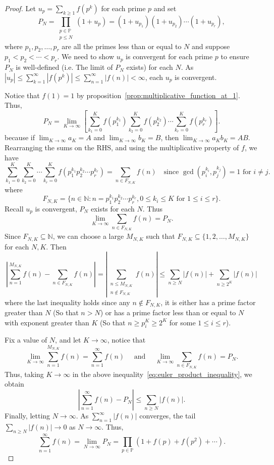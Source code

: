 \documentclass{elegantbook}
\begin{document}
\begin{proof}
  Let $u_p = \sum_{k\geq 1} f(p^k)$ for each prime $p$ and set
  \[
    P_N = \prod_{\substack{p\in\mathbb{P}\\p\leq N}} \left(1 + u_p\right)= (1 + u_{p_1})(1 + u_{p_2}) \cdots (1 + u_{p_r}),
  \]
  where $p_1, p_2, \ldots, p_r$ are all the primes less than or equal to $N$ and suppose $p_1<p_2<\cdots<p_r$. We need to show $u_p$ is convergent for each prime $p$ to ensure $P_N$ is well-defined (i.e. The limit of $P_N$ exists) for each $N$. As $|u_p|\leq \sum_{k=1}^{\infty} |f(p^k)|\leq \sum_{n=1}^{\infty} |f(n)|<\infty$, each $u_p$ is convergent.
  
  Notice that $f(1)=1$ by proposition~\ref{prop:multiplicative_function_at_1}. Thus,
  \[
    P_N = \lim_{K\to\infty}[\sum_{k_1=0}^{K} f(p_1^{k_1})\sum_{k_2=0}^{K} f(p_2^{k_2}) \cdots \sum_{k_r=0}^{K} f(p_r^{k_r})].
  \]
  because if $\lim_{K\to\infty} a_K = A$ and $\lim_{K\to\infty} b_K = B$, then $\lim_{K\to\infty} a_K b_K = AB$.
  Rearranging the sums on the RHS, and using the multiplicative property of $f$, we have
  \[
    \sum_{k_1=0}^{K} \sum_{k_2=0}^{K} \cdots \sum_{k_r=0}^{K} f(p_1^{k_1} p_2^{k_2} \cdots p_r^{k_r})=\sum_{n \in F_{N,K}}f(n) \quad \text{since } \gcd(p_i^{k_i}, p_j^{k_j}) = 1 \text{ for } i \ne j.
  \]
  where
  \[
    F_{N,K} = \{ n \in \mathbb{N} : n = p_1^{k_1} p_2^{k_2} \cdots p_r^{k_r}, 0 \leq k_i \leq K \text{ for } 1 \leq i \leq r\}.
  \]
  Recall $u_p$ is convergent, $P_N$ exists for each $N$. Thus
  \[
    \lim_{K\to\infty} \sum_{n \in F_{N,K}} f(n) = P_N.
  \]
  Since $F_{N,K} \subseteq \mathbb{N}$, we can choose a large $M_{N,K}$ such that $F_{N,K} \subseteq \{1, 2, \ldots, M_{N,K}\}$ for each $N,K$. Then
  \begin{equation} \label{eq:euler_product_inequality}
    \left| \sum_{n=1}^{M_{N,K}} f(n) - \sum_{n \in F_{N,K}} f(n) \right| = \left| \sum_{\substack{n\leq M_{N,K} \\ n \notin F_{N,K}}} f(n) \right| \leq \sum_{n\geq N} |f(n)| + \sum_{n \geq 2^K} |f(n)|
  \end{equation}
  where the last inequality holds since any $n \notin F_{N,K}$, it is either has a prime factor greater than $N$ (So that $n>N$) or has a prime factor less than or equal to $N$ with exponent greater than $K$ (So that $n \geq p_i^{K}\geq 2^{K}$ for some $1 \leq i \leq r$).

  Fix a value of $N$, and let $K \to \infty$, notice that
  \[
    \lim_{K\to\infty} \sum_{n=1}^{M_{N,K}} f(n) = \sum^{\infty}_{n=1} f(n) \quad \text{ and } \quad \lim_{K\to\infty} \sum_{n \in F_{N,K}} f(n) = P_N.
  \]
  Thus, taking $K \to \infty$ in the above inequality~\eqref{eq:euler_product_inequality}, we obtain
  \[
    \left| \sum_{n=1}^{\infty} f(n) - P_N \right| \leq \sum_{n\geq N} |f(n)|.
  \]
  Finally, letting $N \to \infty$. As $\sum_{n=1}^{\infty} |f(n)|$ converges, the tail $\sum_{n\geq N} |f(n)| \to 0$ as $N \to \infty$. Thus,
  \[
    \sum_{n=1}^{\infty} f(n) = \lim_{N\to\infty} P_N = \prod_{p\in\mathbb{P}} \left(1 + f(p) + f(p^2) + \cdots\right).
  \]
\end{proof}
\end{document}
